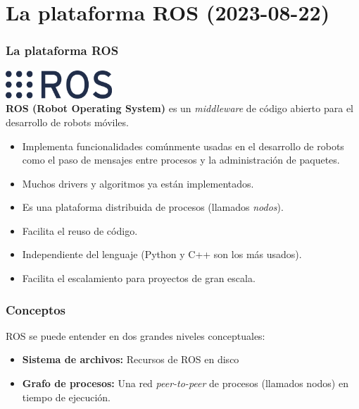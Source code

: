 \section{La plataforma ROS (2023-08-22)}
\begin{frame}\frametitle{La plataforma ROS}
  \includegraphics[width=0.3\textwidth]{Figures/Ros_logo.png}
  \[\]
  \textbf{ROS (Robot Operating System) } es un \textit{middleware} de código abierto para el desarrollo de robots móviles.
  \begin{itemize}
  \item Implementa funcionalidades comúnmente usadas en el desarrollo de robots como el paso de mensajes entre procesos y la administración de paquetes.
  \item Muchos drivers y algoritmos ya están implementados.
  \item Es una plataforma distribuida de procesos (llamados \textit{nodos}).
  \item Facilita el reuso de código.
  \item Independiente del lenguaje (Python y C++ son los más usados).
  \item Facilita el escalamiento para proyectos de gran escala. 
  \end{itemize}
\end{frame}

\begin{frame}\frametitle{Conceptos}
  ROS se puede entender en dos grandes niveles conceptuales:
  \begin{itemize}
  \item \textbf{Sistema de archivos:} Recursos de ROS en disco
  \item \textbf{Grafo de procesos:} Una red \textit{peer-to-peer} de procesos (llamados nodos) en tiempo de ejecución.
  \end{itemize}
\end{frame}


